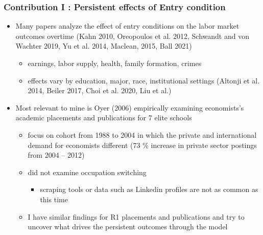 \documentclass[11pt]{beamer}
\begin{document}
\begin{frame}
	\frametitle{Contribution I : Persistent effects of Entry condition} 
	\begin{itemize}
		\item Many papers analyze the effect of entry conditions on the labor market outcomes overtime (Kahn 2010, Oreopoulos et al. 2012, Schwandt and von Wachter 2019, Yu et al. 2014,  Maclean, 2015, Ball 2021)
		\begin{itemize}
			\item earnings, labor supply, health, family formation, crimes
			\item effects vary by education, major, race, institutional settings (Altonji et al. 2014, Beiler 2017, Choi et al. 2020, Liu et al.)
		\end{itemize}
		\vspace{1 mm}
		\item Most relevant to mine is Oyer (2006) empirically examining economists’s academic placements and publications for 7 elite schools%
		\begin{itemize}
			\item focus on cohort from 1988 to 2004 in which the private and international demand for economists different (73 \% increase in private sector postings from 2004 -- 2012)
			\item did not examine occupation switching
			\begin{itemize}
				\item scraping tools or data such as Linkedin profiles are not as common as this time
			\end{itemize}
			  \item I have similar findings for R1 placements and publications and try to uncover what drives the persistent outcomes through the model
		\end{itemize}
		
	\end{itemize}
\end{frame}
\end{document}
